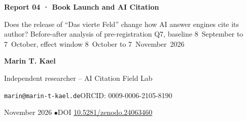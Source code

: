 \documentclass[11pt]{article}
\begin{document}
\begin{center}
{\LARGE\bfseries Report 04 · Book Launch and AI Citation\par}
\vspace{4pt}
{\large Does the release of “Das vierte Feld” change how AI answer engines cite its author? Before-after analysis of pre-registration Q7, baseline 8~September to 7~October, effect window 8~October to 7~November~2026\par}
\vspace{14pt}
{\large\bfseries Marin T. Kael\par}
\vspace{2pt}
Independent researcher -- AI Citation Field Lab\par
\texttt{marin@marin-t-kael.de}\quad ORCID: 0009-0006-2105-8190\par
\vspace{12pt}
{\large November 2026 \quad$\bullet$\quad DOI \href{https://doi.org/10.5281/zenodo.24063460}{10.5281/zenodo.24063460}\par}
\end{center}
\vspace{6pt}
\end{document}
